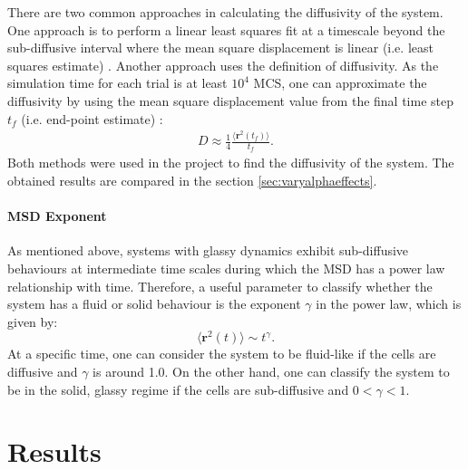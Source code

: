 \documentclass[a4paper,12pt]{article}
\begin{document}
There are two common approaches in calculating the diffusivity of the system. One approach is to perform a linear least squares fit at a timescale beyond the sub-diffusive interval where the mean square displacement is linear (i.e. least squares estimate) \cite{michalet2010}. Another approach uses the definition of diffusivity. As the simulation time for each trial is at least $10^4$ MCS, one can approximate the diffusivity by using the mean square displacement value from the final time step $t_f$ (i.e. end-point estimate) \cite{bi2015motility}:
\begin{eqnarray}
D \approx \frac{1}{4} \frac{\langle{\bm{r}^2(t_f)\rangle}}{t_f}.
\end{eqnarray}
Both methods were used in the project to find the diffusivity of the system. The obtained results are compared in the section \ref{sec:varyalphaeffects}.

\paragraph{MSD Exponent}
As mentioned above, systems with glassy dynamics exhibit sub-diffusive behaviours at intermediate time scales during which the MSD has a power law relationship with time. Therefore, a useful parameter to classify whether the system has a fluid or solid behaviour is the exponent $\gamma$ in the power law, which is given by:
\begin{equation}
\langle\bm{r}^2(t)\rangle \sim t^{\gamma}.
\end{equation}
At a specific time, one can consider the system to be fluid-like if the cells are diffusive and $\gamma$ is around 1.0. On the other hand, one can classify the system to be in the solid, glassy regime if the cells are sub-diffusive and $0 < \gamma < 1$.

\section{Results}
\end{document}
